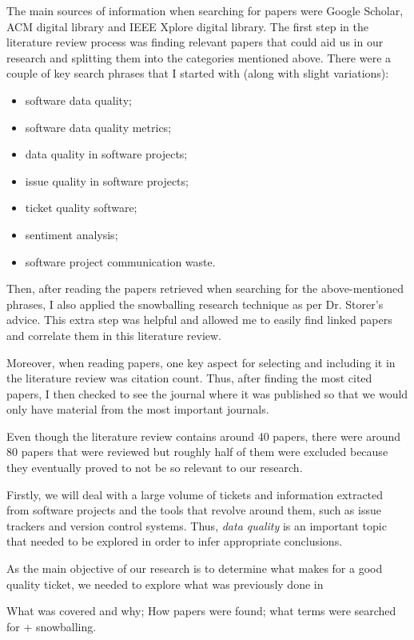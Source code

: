 \documentclass{mprop}
\begin{document}
The main sources of information when searching for papers were Google Scholar, 
ACM digital library and IEEE Xplore digital library. The first step in the 
literature review process was finding relevant papers that could aid us in
our research and splitting them into the categories mentioned above. There were
a couple of key search phrases that I started with (along with slight 
variations):
  \begin{itemize}
    \item software data quality;
    \item software data quality metrics;
    \item data quality in software projects;
    \item issue quality in software projects;
    \item ticket quality software;
    \item sentiment analysis;
    \item software project communication waste.
  \end{itemize}

Then, after reading the papers retrieved when searching for the above-mentioned
phrases, I also applied the snowballing research technique as per Dr. Storer's 
advice. This extra step was helpful and allowed me to easily find linked 
papers and correlate them in this literature review.

Moreover, when reading papers, one key aspect for selecting and including it
in the literature review was citation count. Thus, after finding the most 
cited papers, I then checked to see the journal where it was published so that
we would only have material from the most important journals.

Even though the literature review contains around 40 papers, there were
around 80 papers that were reviewed but roughly half of them were excluded 
because they eventually proved to not be so relevant to our research.

Firstly, we will deal with a large volume of tickets and information extracted 
from software projects and the tools that revolve around them, such as issue 
trackers and version control systems. Thus, \emph{data quality} is an important 
topic that needed to be explored in order to infer appropriate conclusions.  

As the main objective of our research is to determine what makes for a good 
quality ticket, we needed to explore what was previously done in 

What was covered and why; How papers were found; what terms were searched for + snowballing.
\end{document}

